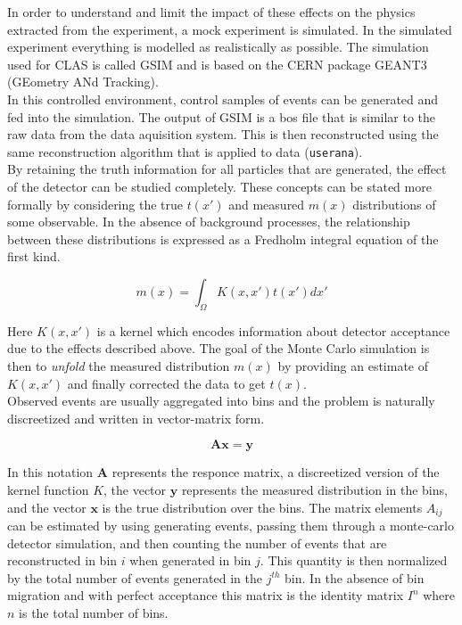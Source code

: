 In order to understand and limit the impact of these effects on the physics extracted from the experiment, a mock experiment is simulated.  In the simulated experiment everything is modelled as realistically as possible.  The simulation used for CLAS is called GSIM and is based on the CERN package GEANT3 (GEometry ANd Tracking).\\
In this controlled environment, control samples of events can be generated and fed into the simulation.  The output of GSIM is a bos file that is similar to the raw data from the data aquisition system. This is then reconstructed using the same reconstruction algorithm that is applied to data (\texttt{userana}).  \\ 
By retaining the truth information for all particles that are generated, the effect of the detector can be studied completely.  These concepts can be stated more formally by considering the true $t(x')$ and measured $m(x)$ distributions of some observable.  In the absence of background processes, the relationship between these distributions is expressed as a Fredholm integral equation of the first kind.

\begin{equation}
	m(x) = \int_{\Omega} K(x,x') t(x') dx'
\end{equation}
    
Here $K(x,x')$ is a kernel which encodes information about detector acceptance due to the effects described above.  The goal of the Monte Carlo simulation is then to \textit{unfold} the measured distribution $m(x)$ by providing an estimate of $K(x,x')$ and finally corrected the data to get $t(x)$.\\
Observed events are usually aggregated into bins and the problem is naturally discreetized and written in vector-matrix form.

\begin{equation}
	\mathbf{A} \mathbf{x} = \mathbf{y}
\end{equation}        

In this notation $\mathbf{A}$ represents the responce matrix, a discreetized version of the kernel function $K$, the vector $\mathbf{y}$ represents the measured distribution in the bins, and the vector $\mathbf{x}$ is the true distribution over the bins.  The matrix elements $A_{ij}$ can be estimated by using generating events, passing them through a monte-carlo detector simulation, and then counting the number of events that are reconstructed in bin $i$ when generated in bin $j$.  This quantity is then normalized by the total number of events generated in the $j^{th}$ bin.  In the absence of bin migration and with perfect acceptance this matrix is the identity matrix $I^{n}$ where $n$ is the total number of bins. \\

